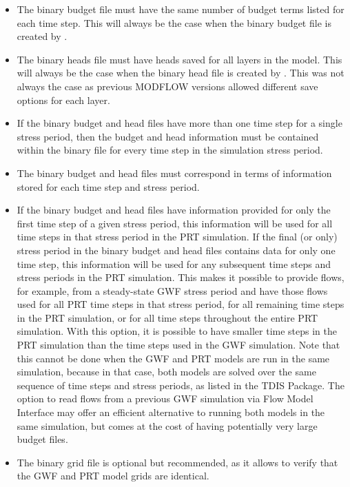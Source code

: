 \begin{itemize}
\begin{itemize}
\item The binary budget file must have the same number of budget terms listed for each time step.  This will always be the case when the binary budget file is created by \mf.
\item The binary heads file must have heads saved for all layers in the model.  This will always be the case when the binary head file is created by \mf.  This was not always the case as previous MODFLOW versions allowed different save options for each layer.
\item If the binary budget and head files have more than one time step for a single stress period, then the budget and head information must be contained within the binary file for every time step in the simulation stress period.
\item The binary budget and head files must correspond in terms of information stored for each time step and stress period.
\item If the binary budget and head files have information provided for only the first time step of a given stress period, this information will be used for all time steps in that stress period in the PRT simulation. If the final (or only) stress period in the binary budget and head files contains data for only one time step, this information will be used for any subsequent time steps and stress periods in the PRT simulation. This makes it possible to provide flows, for example, from a steady-state GWF stress period and have those flows used for all PRT time steps in that stress period, for all remaining time steps in the PRT simulation, or for all time steps throughout the entire PRT simulation. With this option, it is possible to have smaller time steps in the PRT simulation than the time steps used in the GWF simulation. Note that this cannot be done when the GWF and PRT models are run in the same simulation, because in that case, both models are solved over the same sequence of time steps and stress periods, as listed in the TDIS Package. The option to read flows from a previous GWF simulation via Flow Model Interface may offer an efficient alternative to running both models in the same simulation, but comes at the cost of having potentially very large budget files.
\item The binary grid file is optional but recommended, as it allows \mf to verify that the GWF and PRT model grids are identical.
\end{itemize}

\end{itemize}

